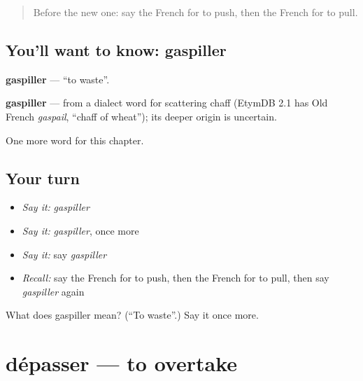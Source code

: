 \label{lesson:FR-C181-gaspiller}



\begin{quote}
Before the new one: say the French for to push, then the French for to pull.
\end{quote}

\subsection*{You'll want to know: gaspiller}
\textbf{gaspiller} — \textquotedblleft{}to waste\textquotedblright{}.

\begin{cousinweb}
\textbf{gaspiller} — from a dialect word for scattering chaff (EtymDB 2.1 has Old French \emph{gaspail}, \textquotedblleft{}chaff of wheat\textquotedblright{}); its deeper origin is uncertain.
\end{cousinweb}

\begin{grammarlens}[title={What you've built}]
One more word for this chapter.
\end{grammarlens}

\subsection*{Your turn}
\begin{itemize}
\raggedright
  \item \emph{Say it:} \emph{gaspiller}
  \item \emph{Say it:} \emph{gaspiller}, once more
  \item \emph{Say it:} say \emph{gaspiller}
  \item \emph{Recall:} say the French for to push, then the French for to pull, then say \emph{gaspiller} again
\end{itemize}

\begin{tcolorbox}[breakable,colback=teal!4,colframe=teal!35!black,title={Before you move on}]
What does gaspiller mean? (\textquotedblleft{}To waste\textquotedblright{}.) Say it once more.
\end{tcolorbox}
\section[dépasser]{dépasser — to overtake}

\label{lesson:FR-C181-depasser}



